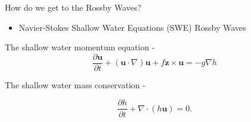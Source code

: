 \documentclass[12pt]{beamer}
\begin{document}
\begin{frame}{How do we get to the Rossby Waves?}

\begin{itemize}
\item Navier-Stokes \MVRightarrow  Shallow Water Equations (SWE) \MVRightarrow  Rossby Waves
\end{itemize}

\vspace{15pt}


The shallow water momentum equation -
\begin{equation}
\frac{\partial{\mathbf{u}}}{\partial{t}} + (\mathbf{u}\cdot\nabla)\mathbf{u} + f \textbf{z} \times \mathbf{u} = -g \nabla h \label{momentum_eq}
\end{equation}

The shallow water mass conservation - 

\begin{equation}
\frac{\partial h}{\partial t} + \nabla \cdot (h \mathbf{u}) = 0.\label{mass_conservation}
\end{equation}
\end{frame}
%
%
%
%
%
%
%
%
\end{document}

